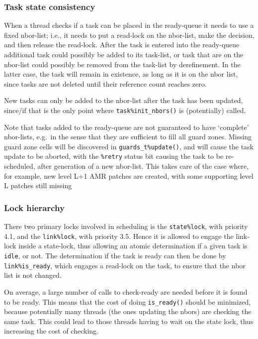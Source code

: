 \documentclass[paper=a4,fontsize=11pt]{scrartcl}
\numberwithin{equation}{section}		%
\numberwithin{figure}{section}			%
\numberwithin{table}{section}				%
\newcommand{\codecolor}{\color{Blue}}
\newcommand{\Code}[1]{{\codecolor\texttt{#1}}}
\def\eg{e.g.\ }
\begin{document}
\subsubsection{Task state consistency}
When a thread checks if a task can be placed in the ready-queue it needs to use a fixed nbor-list; i.e., it needs to put a read-lock on the nbor-list, make the decision, and then release the read-lock.  After the task is entered into the ready-queue additional task could possibly be added to its task-list, or task that are on the nbor-list could possibly be removed from the task-list by derefinement.  In the latter case, the task will remain in existence, as long as it is on the nbor list, since tasks are not deleted until their reference count reaches zero.

New tasks can only be added to the nbor-list after the task has been updated, since/if that is the only point where \Code{task\%init\_nbors()} is (potentially) called.

Note that tasks added to the ready-queue are not guaranteed to have `complete' nbor-lists, \eg in the sense that they are sufficient to fill all guard zones.  Missing guard zone cells will be discovered in \Code{guards\_t\%update()}, and will cause the task update to be aborted, with the \Code{\%retry} status bit causing the task to be re-scheduled, after generation of a new nbor-list.   This takes care of the case where, for example, new level L+1 AMR patches are created, with some supporting level L patches still missing

\subsubsection{Lock hierarchy}
There two primary locks involved in scheduling is the \verb|state%lock|, with priority 4.1, and the \verb|link%lock|, with priority 3.5.   Hence it is allowed to engage the link-lock inside a state-lock, thus allowing an atomic determination if a given task is \verb|idle|, or not.  The determination if the task is ready can then be done by \verb|link%is_ready|, which engages a read-lock on the task, to ensure that the nbor list is not changed.

On average, a large number of calls to check-ready are needed before it is found to be ready.   This means that the cost of doing \verb|is_ready()| should be minimized, because potentially many threads (the ones updating the nbors) are checking the same task.  This could lead to those threads having to wait on the state lock, thus increasing the cost of checking.
\end{document}
